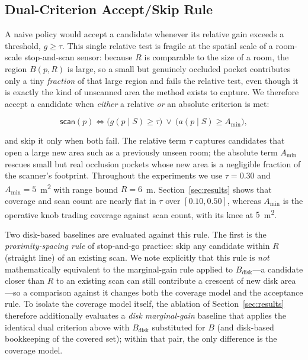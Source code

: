 \documentclass[sensors,article,submit,pdftex,moreauthors]{Definitions/mdpi}
\begin{document}
\subsection{Dual-Criterion Accept/Skip Rule}

A naive policy would accept a candidate whenever its relative gain exceeds a
threshold, $g\ge\tau$. This single relative test is fragile at the spatial scale
of a room-scale stop-and-scan sensor: because $R$ is comparable to the size of a
room, the region $B(p,R)$ is large, so a small but genuinely occluded pocket contributes
only a tiny \emph{fraction} of that large region and fails the relative test,
even though it is exactly the kind of unscanned area the method exists to
capture. We therefore accept a candidate when \emph{either} a relative \emph{or}
an absolute criterion is met:

\begin{equation}
\textsf{scan}(p)\iff
\big(g(p\mid S)\ge\tau\big)\ \lor\ \big(a(p\mid S)\ge A_{\min}\big),
\end{equation}

and skip it only when both fail. The relative term $\tau$ captures candidates
that open a large new area such as a previously unseen room; the absolute term
$A_{\min}$ rescues small but real occlusion pockets whose new area is a
negligible fraction of the scanner's footprint. Throughout the experiments we
use $\tau=0.30$ and $A_{\min}=5$~m\textsuperscript{2} with range bound
$R=6$~m. Section~\ref{sec:results} shows that coverage and scan count are nearly
flat in $\tau$ over $[0.10,0.50]$, whereas $A_{\min}$ is the operative knob
trading coverage against scan count, with its knee at $5$~m\textsuperscript{2}.

Two disk-based baselines are evaluated against this rule. The first is the
\emph{proximity-spacing rule} of stop-and-go practice: skip any candidate
within $R$ (straight line) of an existing scan. We note explicitly that this
rule is \emph{not} mathematically equivalent to the marginal-gain rule applied
to $B_{\mathrm{disk}}$---a candidate closer than $R$ to an existing scan can
still contribute a crescent of new disk area---so a comparison against it
changes both the coverage model and the acceptance rule. To isolate the
coverage model itself, the ablation of Section~\ref{sec:results} therefore
additionally evaluates a \emph{disk marginal-gain} baseline that applies the
identical dual criterion above with $B_{\mathrm{disk}}$ substituted for $B$
(and disk-based bookkeeping of the covered set); within that pair, the only
difference is the coverage model.
\end{document}
